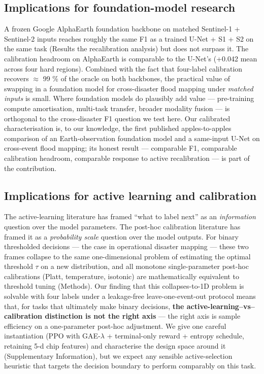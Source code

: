 \subsection{Implications for foundation-model research}\label{implications-for-foundation-model-research}

A frozen Google AlphaEarth foundation backbone on matched Sentinel-1 +
Sentinel-2 inputs reaches roughly the same F1 as a trained U-Net + S1 +
S2 on the same task (Results the recalibration analysis) but does not surpass it. The
calibration headroom on AlphaEarth is comparable to the U-Net's
(+0.042 mean across four hard regions). Combined with the fact that
four-label calibration recovers $\approx$ 99 \% of the oracle on both backbones,
the practical value of
swapping in a foundation model for cross-disaster flood mapping under
\emph{matched inputs} is small. Where foundation models do plausibly add
value --- pre-training compute amortisation, multi-task transfer, broader
modality fusion --- is orthogonal to the cross-disaster F1 question we
test here. Our calibrated characterisation is, to our knowledge, the
first published apples-to-apples comparison of an Earth-observation
foundation model and a same-input U-Net on cross-event flood mapping;
its honest result --- comparable F1, comparable calibration headroom,
comparable response to active recalibration --- is part of the
contribution.

\subsection{Implications for active learning and calibration}\label{implications-for-active-learning-and-calibration}

The active-learning literature has framed ``what to label next'' as an
\emph{information} question over the model parameters. The post-hoc
calibration literature has framed it as a \emph{probability scale} question
over the model outputs. For binary thresholded decisions --- the case in
operational disaster mapping --- these two frames collapse to the same
one-dimensional problem of estimating the optimal threshold $\tau$ on a new
distribution, and all monotone single-parameter post-hoc calibrations
(Platt, temperature, isotonic) are mathematically equivalent to
threshold tuning (Methods). Our finding that this collapses-to-1D
problem is solvable with four labels under a leakage-free
leave-one-event-out protocol means that, for tasks that ultimately make
binary decisions, \textbf{the active-learning--vs--calibration distinction is
not the right axis} --- the right axis is sample efficiency on a
one-parameter post-hoc adjustment. We give one careful instantiation
(PPO with GAE-$\lambda$ + terminal-only reward + entropy schedule, retaining
5-d chip features) and characterise the design space around it
(Supplementary Information), but we expect any sensible active-selection
heuristic that targets the decision boundary to perform comparably on
this task.

